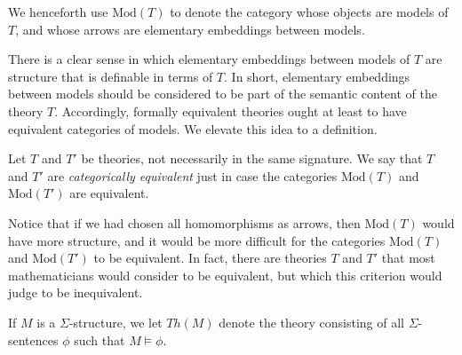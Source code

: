 \begin{defn} We henceforth use $\mathrm{Mod}(T)$ to denote the
  category whose objects are models of $T$, and whose arrows are
  elementary embeddings between models. \end{defn}

There is a clear sense in which elementary embeddings between models
of $T$ are structure that is definable in terms of $T$. In short,
elementary embeddings between models should be considered to be part
of the semantic content of the theory $T$.  Accordingly, formally
equivalent theories ought at least to have equivalent categories of
models.  We elevate this idea to a definition.

\begin{defn} Let $T$ and $T'$ be theories, not necessarily in the same
  signature.  We say that $T$ and $T'$ are \emph{categorically
    equivalent} just in case the categories $\mathrm{Mod}(T)$ and
  $\mathrm{Mod}(T')$ are equivalent. \end{defn}

Notice that if we had chosen all homomorphisms as arrows, then
$\mathrm{Mod}(T)$ would have more structure, and it would be more
difficult for the categories $\mathrm{Mod}(T)$ and $\mathrm{Mod}(T')$
to be equivalent.  In fact, there are theories $T$ and $T'$ that most
mathematicians would consider to be equivalent, but which this
criterion would judge to be inequivalent.








\begin{defn} If $M$ is a $\Sigma$-structure, we let $Th(M)$ denote the
  theory consisting of all $\Sigma$-sentences $\phi$ such that
  $M\vDash\phi$. \end{defn}


